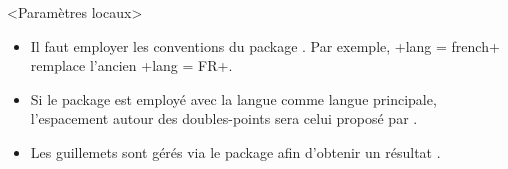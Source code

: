 

\begin{bdoctopic}<Paramètres locaux>
    \begin{itemize}
        \item Il faut employer les conventions  du package .
        Par exemple, \bdocinlatex+lang = french+ remplace l'ancien \bdocinlatex+lang = FR+.

        \item Si le package  est employé avec la langue  comme langue principale, l'espacement autour des doubles-points sera celui proposé par .

        \item Les guillemets sont gérés via le package  afin d'obtenir un résultat .
    \end{itemize}
\end{bdoctopic}
